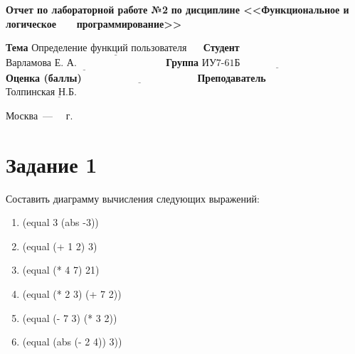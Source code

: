 \documentclass[12pt]{report}
\begin{document}
\begin{titlepage}
		\begin{center}
			\noindent\begin{minipage}{1.1\textwidth}\centering
				\Large\textbf{  Отчет по лабораторной работе №2}\newline
				\textbf{по дисциплине <<Функциональное и логическое}\newline
				\textbf{~~~программирование>>}\newline\newline
			\end{minipage}
		\end{center}
		
		\noindent\textbf{Тема} $\underline{\text{Определение функций пользователя~~~~}}$\newline\newline
		\noindent\textbf{Студент} $\underline{\text{Варламова Е. А.~~~~~~~~~~~~~~~~~~~~~~~~~~}}$\newline\newline
		\noindent\textbf{Группа} $\underline{\text{ИУ7-61Б~~~~~~~~~~~~~~~~~~~~~~~~~~~~~~~~~~}}$\newline\newline
		\noindent\textbf{Оценка (баллы)} $\underline{\text{~~~~~~~~~~~~~~~~~~~~~~~~~~~~~~~~~}}$\newline\newline
		\noindent\textbf{Преподаватель} $\underline{\text{Толпинская Н.Б.~~~~~~~~~~~}}$\newline\newline\newline
		
		\begin{center}
			\vfill
			Москва~---~\the\year
			~г.
		\end{center}
	\end{titlepage}
	
\setcounter{page}{2}
\section*{Задание 1}
Составить диаграмму вычисления следующих выражений:

\begin{enumerate}
	\item (equal 3 (abs -3))
	\item (equal (+ 1 2) 3)
	\item (equal (* 4 7) 21)
	\item (equal (* 2 3) (+ 7 2))
	\item (equal (- 7 3) (* 3 2))
	\item (equal (abs (- 2 4)) 3))
\end{enumerate}
\end{document}
